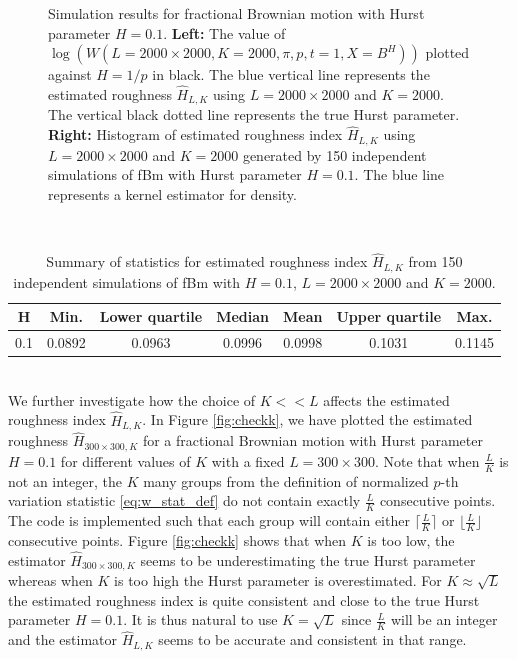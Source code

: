 \documentclass{article}
\begin{document}
\begin{figure}[htbp]
    \caption{Simulation results for fractional Brownian motion with Hurst parameter $H=0.1$. \textbf{Left:} The value of $\log(W(L=2000\times 2000, K=2000, \pi, p, t=1, X=B^H))$ plotted against $H=1/p$ in black. The blue vertical line represents the estimated roughness $\hat{H}_{L,K}$ using $L=2000\times 2000$ and $K=2000$. The vertical black dotted line represents the true Hurst parameter. \textbf{Right:} Histogram of estimated roughness index $\widehat{H}_{L,K}$ using $L=2000\times 2000$ and $K=2000$ generated by 150 independent simulations of fBm with Hurst parameter $H=0.1$. The blue line represents a kernel estimator for density. }
    \label{fig:check2000}
\end{figure}\\
\begin{table}[htbp]
    \centering
    \begin{tabular}{ccccccc}
        \toprule
        H & Min. & Lower quartile & Median & Mean & Upper quartile & Max. \\
        \midrule
        0.1 & 0.0892 & 0.0963 & 0.0996 & 0.0998 & 0.1031 & 0.1145 \\
        \bottomrule
    \end{tabular}
    \caption{Summary of statistics for estimated roughness index $\widehat{H}_{L,K}$ from 150 independent simulations of fBm with $H=0.1$, $L=2000\times 2000$ and $K=2000$.}
    \label{tab:check2000}
\end{table}\\
We further investigate how the choice of $K<<L$ affects the estimated roughness index $\hat{H}_{L,K}$. In Figure \ref{fig:checkk}, we have plotted the estimated roughness $\hat{H}_{300\times 300,K}$ for a fractional Brownian motion with Hurst parameter $H=0.1$ for different values of $K$ with a fixed $L=300\times 300$. Note that when $\frac{L}{K}$ is not an integer, the $K$ many groups from the definition of normalized $p$-th variation statistic \eqref{eq:w_stat_def} do not contain exactly $\frac{L}{K}$ consecutive points. The code is implemented such that each group will contain either $\lceil \frac{L}{K} \rceil$ or $\lfloor \frac{L}{K} \rfloor$ consecutive points. Figure \ref{fig:checkk} shows that when $K$ is too low, the estimator $\hat{H}_{300\times 300,K}$ seems to be underestimating the true Hurst parameter whereas when $K$ is too high the Hurst parameter is overestimated. For $K\approx \sqrt{L}$ the estimated roughness index is quite consistent and close to the true Hurst parameter $H=0.1$. It is thus natural to use $K=\sqrt{L}$ since $\frac{L}{K}$ will be an integer and the estimator $\widehat{H}_{L,K}$ seems to be accurate and consistent in that range.
\end{document}
